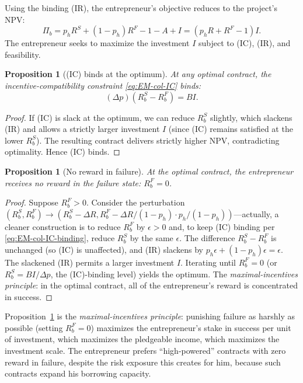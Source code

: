 \documentclass[11pt,a4paper,oneside]{book}
\theoremstyle{plain}
\newtheorem{proposition}[theorem]{Proposition}
\theoremstyle{definition}
\theoremstyle{remark}
\numberwithin{equation}{chapter}
\begin{document}
Using the binding (IR), the entrepreneur's objective reduces to the project's NPV:
\begin{equation}\label{eq:EM-col-NPV}
  \Pi_b = p_h R^S + (1 - p_h) R^F - 1 - A + I = (p_h R + R^F - 1) I.
\end{equation}
The entrepreneur seeks to maximize the investment $I$ subject to (IC), (IR), and feasibility.

\begin{proposition}[(IC) binds at the optimum]\label{prop:EM-col-IC-binds}
At any optimal contract, the incentive-compatibility constraint \eqref{eq:EM-col-IC} binds:
\begin{equation}\label{eq:EM-col-IC-binding}
  (\Delta p)(R_b^S - R_b^F) = B I.
\end{equation}
\end{proposition}

\begin{proof}
If (IC) is slack at the optimum, we can reduce $R_b^S$ slightly, which slackens (IR) and allows a strictly larger investment $I$ (since (IC) remains satisfied at the lower $R_b^S$).
The resulting contract delivers strictly higher NPV, contradicting optimality.
Hence (IC) binds.
\end{proof}

\begin{proposition}[No reward in failure]\label{prop:EM-col-RbF-zero}
At the optimal contract, the entrepreneur receives no reward in the failure state: $R_b^F = 0$.
\end{proposition}

\begin{proof}
Suppose $R_b^F > 0$.
Consider the perturbation $(R_b^S, R_b^F) \to (R_b^S - \Delta R, R_b^F - \Delta R / (1 - p_h) \cdot p_h / (1 - p_h))$---actually, a cleaner construction is to reduce $R_b^F$ by $\epsilon > 0$ and, to keep (IC) binding per \eqref{eq:EM-col-IC-binding}, reduce $R_b^S$ by the same $\epsilon$.
The difference $R_b^S - R_b^F$ is unchanged (so (IC) is unaffected), and (IR) slackens by $p_h \epsilon + (1 - p_h) \epsilon = \epsilon$.
The slackened (IR) permits a larger investment $I$.
Iterating until $R_b^F = 0$ (or $R_b^S = B I / \Delta p$, the (IC)-binding level) yields the optimum.
The \emph{maximal-incentives principle}: in the optimal contract, all of the entrepreneur's reward is concentrated in success.
\end{proof}

Proposition~\ref{prop:EM-col-RbF-zero} is the \emph{maximal-incentives principle}: punishing failure as harshly as possible (setting $R_b^F = 0$) maximizes the entrepreneur's stake in success per unit of investment, which maximizes the pledgeable income, which maximizes the investment scale.
The entrepreneur prefers ``high-powered'' contracts with zero reward in failure, despite the risk exposure this creates for him, because such contracts expand his borrowing capacity.
\end{document}
